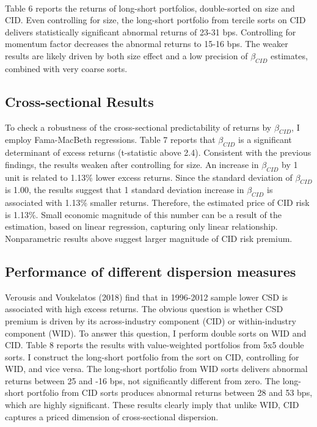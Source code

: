 \documentclass[12pt]{article}
\begin{document}
\paragraph{}
Table 6 reports the returns of long-short portfolios, double-sorted on size and CID. Even controlling for size, the long-short portfolio from tercile sorts on CID delivers statistically significant abnormal returns of 23-31 bps. Controlling for momentum factor decreases the abnormal returns to 15-16 bps. The weaker results are likely driven by both size effect and a low precision of $\beta_{CID}$ estimates, combined with very coarse sorts.

\subsection{Cross-sectional Results}

To check a robustness of the cross-sectional predictability of returns by $\beta_{CID}$, I employ Fama-MacBeth regressions. Table 7 reports that $\beta_{CID}$ is a significant determinant of excess returns (t-statistic above 2.4). Consistent with the previous findings, the results weaken after controlling for size. An increase in $\beta_{CID}$ by 1 unit is related to 1.13\% lower excess returns. Since the standard deviation of $\beta_{CID}$ is 1.00, the results suggest that 1 standard deviation increase in $\beta_{CID}$ is associated with 1.13\% smaller returns. Therefore, the estimated price of CID risk is 1.13\%. Small economic magnitude of this number can be a result of the estimation, based on linear regression, capturing only linear relationship. Nonparametric results above suggest larger magnitude of CID risk premium.

\subsection{Performance of different dispersion measures}

Verousis and Voukelatos (2018) find that in 1996-2012 sample lower CSD is associated with high excess returns. The obvious question is whether CSD premium is driven by its across-industry component (CID) or within-industry component (WID). To answer this question, I perform double sorts on WID and CID. Table 8 reports the results with value-weighted portfolios from 5x5 double sorts. I construct the long-short portfolio from the sort on CID, controlling for WID, and vice versa. The long-short portfolio from WID sorts delivers abnormal returns between 25 and -16 bps, not significantly different from zero. The long-short portfolio from CID sorts produces abnormal returns between 28 and 53 bps, which are highly significant. These results clearly imply that unlike WID, CID captures a priced dimension of cross-sectional dispersion. 
\end{document}
